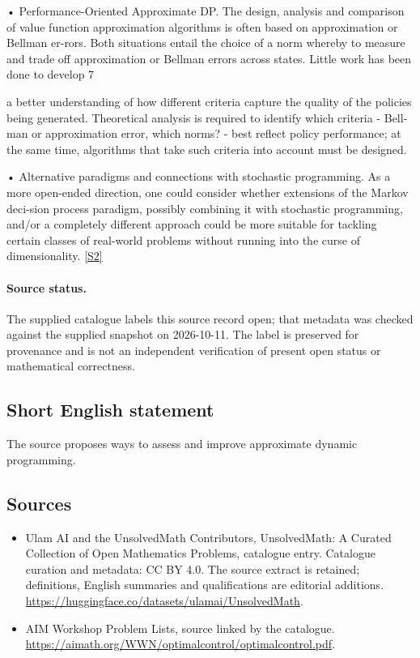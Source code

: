 \documentclass[11pt]{article}
\begin{document}
• Performance-Oriented Approximate DP. The design, analysis and comparison of value function approximation algorithms is often based on approximation or Bellman er-rors. Both situations entail the choice of a norm whereby to measure and trade off approximation or Bellman errors across states. Little work has been done to develop 7

a better understanding of how different criteria capture the quality of the policies being generated. Theoretical analysis is required to identify which criteria - Bell-man or approximation error, which norms? - best reflect policy performance; at the same time, algorithms that take such criteria into account must be designed.

• Alternative paradigms and connections with stochastic programming. As a more open-ended direction, one could consider whether extensions of the Markov deci-sion process paradigm, possibly combining it with stochastic programming, and/or a completely different approach could be more suitable for tackling certain classes of real-world problems without running into the curse of dimensionality. \href{https://aimath.org/WWN/optimalcontrol/optimalcontrol.pdf}{[S2]}
\paragraph{Source status.}
The supplied catalogue labels this source record open; that metadata was checked against the supplied snapshot on 2026-10-11. The label is preserved for provenance and is not an independent verification of present open status or mathematical correctness.
\subsection{Short English statement}
The source proposes ways to assess and improve approximate dynamic programming.
\subsection{Sources}
\begin{itemize}
\item[S1] Ulam AI and the UnsolvedMath Contributors, UnsolvedMath: A Curated Collection of Open Mathematics Problems, catalogue entry. Catalogue curation and metadata: CC BY 4.0. The source extract is retained; definitions, English summaries and qualifications are editorial additions.
\url{https://huggingface.co/datasets/ulamai/UnsolvedMath}.
\item[S2] AIM Workshop Problem Lists, source linked by the catalogue.
\url{https://aimath.org/WWN/optimalcontrol/optimalcontrol.pdf}.
\end{itemize}
\end{document}
